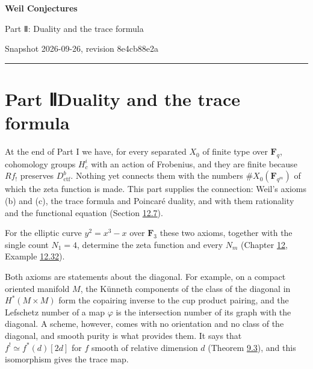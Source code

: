 \documentclass[11pt]{article}
\begin{document}
\pagestyle{plain}
\begin{center}
{\LARGE\bfseries Weil Conjectures\par}
\vspace{0.7em}
{\large Part Ⅱ: Duality and the trace formula\par}
\vspace{0.5em}
{\small\color{bpmuted}Snapshot 2026-09-26, revision 8e4cb88e2a\par}
\end{center}
\vspace{0.5em}
{\small\tableofcontents}
\bigskip\hrule\bigskip

\part*{\texorpdfstring{Part Ⅱ\quad Duality and the trace formula}{Part Ⅱ Duality and the trace formula}}
\label{bp1}%
\label{bp2}%
At the end of Part I we have, for every separated \(X_0\) of finite type over \(\mathbf F_q\), cohomology groups \(H^i_c\) with an action of Frobenius, and they are finite because \(Rf_!\) preserves \(D^b_{\mathrm{ctf}}\). Nothing yet connects them with the numbers \(\#X_0(\mathbf F_{q^m})\) of which the zeta function is made. This part supplies the connection: Weil's axioms (b) and (c), the trace formula and Poincaré duality, and with them rationality and the functional equation (Section \hyperref[bp312]{12.7}).

For the elliptic curve \(y^2=x^3-x\) over \(\mathbf F_3\) these two axioms, together with the single count \(N_1=4\), determine the zeta function and every \(N_m\) (Chapter \hyperref[bp226]{12}, Example \hyperref[bp323]{12.32}).

Both axioms are statements about the diagonal. For example, on a compact oriented manifold \(M\), the Künneth components of the class of the diagonal in \(H^*(M\times M)\) form the copairing inverse to the cup product pairing, and the Lefschetz number of a map \(\varphi\) is the intersection number of its graph with the diagonal. A scheme, however, comes with no orientation and no class of the diagonal, and smooth purity is what provides them. It says that \(f^!\simeq f^*(d)[2d]\) for \(f\) smooth of relative dimension \(d\) (Theorem \hyperref[bp11]{9.3}), and this isomorphism gives the trace map.
\end{document}
